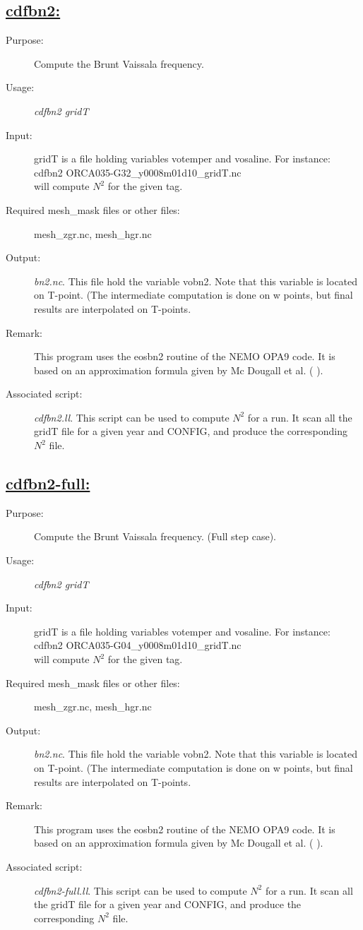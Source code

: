 \documentclass[a4paper,11pt]{article}
\begin{document}
\subsection*{\underline{cdfbn2:}}
\begin{description}
\item[Purpose:] Compute the Brunt Vaissala frequency.
\item[Usage:] {\em cdfbn2 gridT }
\item[Input:] gridT is a file holding variables votemper and vosaline.
For instance: cdfbn2  ORCA035-G32\_y0008m01d10\_gridT.nc  \\
will compute $N^2$ for the given tag.
\item[Required mesh\_mask files or other files:]mesh\_zgr.nc, mesh\_hgr.nc
\item[Output:] {\em bn2.nc}. This file hold the variable vobn2. Note that this variable is located on T-point. (The intermediate
computation is done on w points, but final results are interpolated on T-points.
\item[Remark:]  This program uses the eosbn2 routine of the NEMO OPA9 code. It is based on an approximation formula given
by Mc Dougall et al. (   ).
\item[Associated script:] {\em cdfbn2.ll}. This script can be used to compute $N^2$ for a run.  It scan all
the gridT file for a given year and CONFIG, and produce the corresponding $N^2$ file.
\end{description}

\subsection*{\underline{cdfbn2-full:}}
\begin{description}
\item[Purpose:] Compute the Brunt Vaissala frequency. (Full step case).
\item[Usage:] {\em cdfbn2 gridT }
\item[Input:] gridT is a file holding variables votemper and vosaline.
For instance: cdfbn2  ORCA035-G04\_y0008m01d10\_gridT.nc  \\
will compute $N^2$ for the given tag.
\item[Required mesh\_mask files or other files:]mesh\_zgr.nc, mesh\_hgr.nc
\item[Output:] {\em bn2.nc}. This file hold the variable vobn2. Note that this variable is located on T-point. (The intermediate
computation is done on w points, but final results are interpolated on T-points.
\item[Remark:]  This program uses the eosbn2 routine of the NEMO OPA9 code. It is based on an approximation formula given
by Mc Dougall et al. (   ).
\item[Associated script:] {\em cdfbn2-full.ll}. This script can be used to compute $N^2$ for a run.  It scan all
the gridT file for a given year and CONFIG, and produce the corresponding $N^2$ file.
\end{description}
\end{document}
